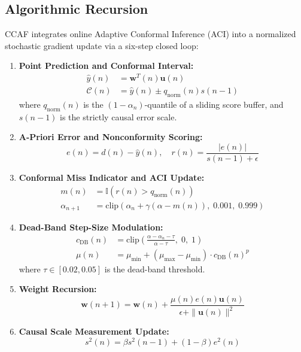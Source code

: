 \documentclass[journal,twocolumn]{IEEEtran}
\begin{document}
\subsection{Algorithmic Recursion}
CCAF integrates online Adaptive Conformal Inference (ACI) into a normalized stochastic gradient update via a six-step closed loop:
\begin{enumerate}
    \item \textbf{Point Prediction and Conformal Interval:}
    \begin{align}
        \hat{y}(n) &= \mathbf{w}^T(n) \mathbf{u}(n) \\
        \mathcal{C}(n) &= \hat{y}(n) \pm q_{\text{norm}}(n) s(n-1)
    \end{align}
    where $q_{\text{norm}}(n)$ is the $(1 - \alpha_n)$-quantile of a sliding score buffer, and $s(n-1)$ is the strictly causal error scale.
    \item \textbf{A-Priori Error and Nonconformity Scoring:}
    \begin{equation}
        e(n) = d(n) - \hat{y}(n), \quad r(n) = \frac{|e(n)|}{s(n-1) + \epsilon}
    \end{equation}
    \item \textbf{Conformal Miss Indicator and ACI Update:}
    \begin{align}
        m(n) &= \mathbb{I}(r(n) > q_{\text{norm}}(n)) \\
        \alpha_{n+1} &= \text{clip}\left(\alpha_n + \gamma(\alpha - m(n)), \; 0.001, \; 0.999\right)
    \end{align}
    \item \textbf{Dead-Band Step-Size Modulation:}
    \begin{align}
        c_{\text{DB}}(n) &= \text{clip}\left( \frac{\alpha - \alpha_n - \tau}{\alpha - \tau}, \; 0, \; 1 \right) \label{eq:deadband} \\
        \mu(n) &= \mu_{\min} + (\mu_{\max} - \mu_{\min}) \cdot c_{\text{DB}}(n)^p
    \end{align}
    where $\tau \in [0.02, 0.05]$ is the dead-band threshold.
    \item \textbf{Weight Recursion:}
    \begin{equation}
        \mathbf{w}(n+1) = \mathbf{w}(n) + \frac{\mu(n) e(n) \mathbf{u}(n)}{\epsilon + \|\mathbf{u}(n)\|^2}
    \end{equation}
    \item \textbf{Causal Scale Measurement Update:}
    \begin{equation}
        s^2(n) = \beta s^2(n-1) + (1-\beta) e^2(n)
    \end{equation}
\end{enumerate}
\end{document}
